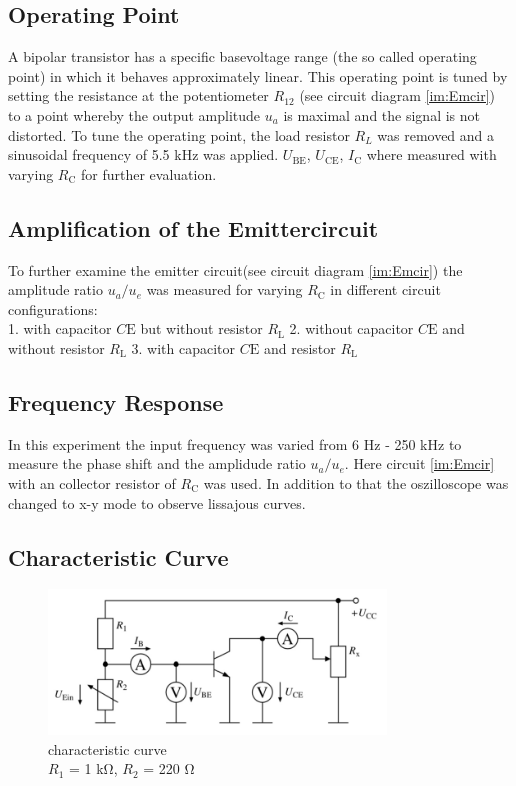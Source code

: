 \documentclass[11pt, a4paper]{article}
\begin{document}
\subsection{Operating Point}
A bipolar transistor has a specific basevoltage range (the so called operating point) in which it behaves approximately linear. This operating point
is tuned by setting the resistance at the potentiometer $R_{12}$ (see circuit diagram \ref{im:Emcir}) to a point whereby the output amplitude $u_a$ is maximal and the signal is not distorted.
To tune the operating point, the load resistor $R_L$ was removed and a sinusoidal frequency of 5.5 \si{\kilo\hertz} was applied. 
$U_{\text{BE}}$, $U_{\text{CE}}$, $I_{\text{C}}$ where measured with varying $R_{\text{C}}$ for further evaluation.
\subsection{Amplification of the Emittercircuit}
To further examine the emitter circuit(see circuit diagram  \ref{im:Emcir}) the amplitude ratio $u_a / u_e$ was measured for varying $R_{\text{C}}$ in different circuit configurations:\\
1. with capacitor $C{\text{E}}$ but without resistor $R_{\text{L}}$
2. without capacitor $C{\text{E}}$ and without resistor $R_{\text{L}}$
3. with capacitor $C{\text{E}}$ and resistor $R_{\text{L}}$
\subsection{Frequency Response}
In this experiment the input frequency was varied from 6 \si{\hertz} - 250 \si{\kilo\hertz} to measure the phase shift and the amplidude ratio $u_a / u_e$. 
Here circuit \ref{im:Emcir} with an collector resistor of $R_{\text{C}}$ was used. In addition to that the oszilloscope was changed to x-y mode to observe lissajous curves.
\subsection{Characteristic Curve}
\begin{figure}[h]
    \centering
    \includegraphics[width=0.8\textwidth]{bilder/characteristicCurve.png}
    \caption{characteristic curve \\
    $R_1$ = 1 \si{\kilo\ohm}, $R_2$ = 220 \si{\ohm}}
    \label{im:Charcurcir}
\end{figure}
\end{document}
